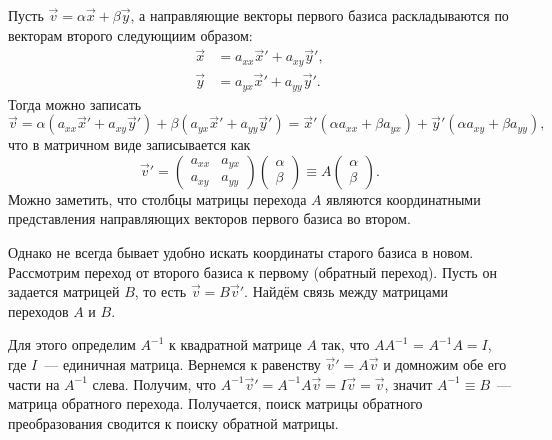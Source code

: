     Пусть $\vec{v} = \alpha \vec{x} + \beta \vec{y}$, а направляющие векторы первого базиса раскладываются по векторам второго следующиим образом:
    \begin{equation*}
        \begin{aligned}
            \vec{x} &= a_{xx} \vec{x}' + a_{xy} \vec{y}',\\
            \vec{y} &= a_{yx} \vec{x}' + a_{yy} \vec{y}'.
        \end{aligned}
    \end{equation*}
    Тогда можно записать
    \begin{equation*}
        \vec{v} = \alpha (a_{xx} \vec{x}' + a_{xy} \vec{y}') + \beta (a_{yx} \vec{x}' + a_{yy} \vec{y}') = \vec{x}' (\alpha a_{xx} + \beta a_{yx}) + \vec{y}' (\alpha a_{xy} + \beta a_{yy}),
    \end{equation*}
    что в матричном виде записывается как
    \begin{equation*}
        \vec{v}' = \begin{pmatrix}
            a_{xx} & a_{yx} \\
            a_{xy} & a_{yy}
        \end{pmatrix} \begin{pmatrix}
            \alpha \\
            \beta
        \end{pmatrix} \equiv A \begin{pmatrix}
            \alpha \\
            \beta
        \end{pmatrix}.
    \end{equation*}
    Можно заметить, что столбцы матрицы перехода $A$ являются координатными представления направляющих векторов первого базиса во втором. 
    
    Однако не всегда бывает удобно искать координаты старого базиса в новом. Рассмотрим переход от второго базиса к первому (обратный переход). Пусть он задается матрицей $B$, то есть $\vec{v} = B \vec{v}'$. Найдём связь между матрицами переходов $A$ и $B$.
    
    Для этого определим  $A^{-1}$ к квадратной матрице $A$ так, что $AA^{-1}$ = $A^{-1} A = I$, где $I$~--- единичная матрица. Вернемся к равенству $\vec{v}' = A \vec{v}$ и домножим обе его части на $A^{-1}$ слева. Получим, что $A^{-1}\vec{v}' = A^{-1} A \vec{v} = I \vec{v} = \vec{v}$, значит $A^{-1} \equiv B$~--- матрица обратного перехода. Получается, поиск матрицы обратного преобразования сводится к поиску обратной матрицы.
    
